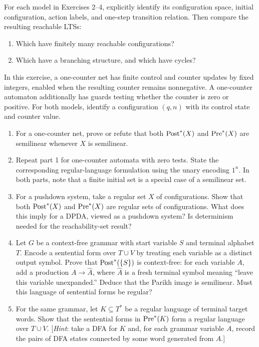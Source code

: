 \documentclass{tutorial}
\begin{document}
\begin{exercise}
For each model in Exercises 2--4, explicitly identify its configuration
space, initial configuration, action labels, and one-step transition
relation. Then compare the resulting reachable LTSs:
\begin{enumerate}
  \item Which have finitely many reachable configurations?
  \item Which have a branching structure, and which have cycles?
  
\end{enumerate}
\end{exercise}


\begin{exercise}
In this exercise, a one-counter net has finite control and counter updates
by fixed integers, enabled when the resulting counter remains
nonnegative. A one-counter automaton additionally has guards testing
whether the counter is zero or positive. For both models, identify a
configuration $(q,n)$ with its control state and counter value.
\begin{enumerate}
  \item For a one-counter net, prove or refute that both
        $\operatorname{Post}^*(X)$ and $\operatorname{Pre}^*(X)$ are
        semilinear whenever $X$ is semilinear.
  \item Repeat part 1 for one-counter automata with zero tests. State the
        corresponding regular-language formulation using the unary encoding
        $1^n$. In both parts, note that a finite initial set is a special
        case of a semilinear set.
  \item For a pushdown system, take a regular set $X$ of configurations.
        Show that both $\operatorname{Post}^*(X)$ and
        $\operatorname{Pre}^*(X)$ are regular sets of configurations. What
        does this imply for a DPDA, viewed as a pushdown system? Is
        determinism needed for the reachability-set result?
  \item Let $G$ be a context-free grammar with start variable $S$ and
        terminal alphabet $T$. Encode a sentential form over $T\cup V$ by
        treating each variable as a distinct output symbol. Prove that
        $\operatorname{Post}^*(\{S\})$ is context-free: for each variable
        $A$, add a production $A\to\widehat{A}$, where $\widehat{A}$ is a
        fresh terminal symbol meaning ``leave this variable unexpanded.''
        Deduce that the Parikh image is semilinear. Must this language of
        sentential forms be regular?
  \item For the same grammar, let $K\subseteq T^*$ be a regular language
        of terminal target words. Show that the sentential forms in
        $\operatorname{Pre}^*(K)$ form a regular language over $T\cup V$.
        [\emph{Hint}: take a DFA for $K$ and, for each grammar variable $A$, record
        the pairs of DFA states connected by some word generated from $A$.]
\end{enumerate}
\end{exercise}
\end{document}

